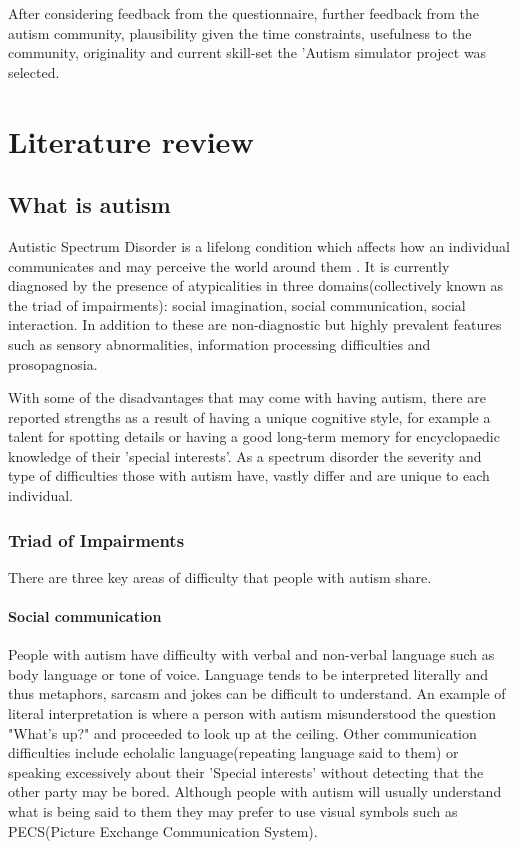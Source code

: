 \documentclass[11pt]{report}
\begin{document}
After considering feedback from the questionnaire, further feedback from the autism community, plausibility given the time constraints, usefulness to the community, originality and current skill-set the 'Autism simulator project was selected.

\chapter{Literature review}

\section{What is autism}

Autistic Spectrum Disorder is a lifelong condition which affects how an individual communicates and may perceive the world around them \cite{nas}. It is currently diagnosed by the presence of atypicalities in three domains(collectively known as the triad of impairments): social imagination, social communication, social interaction. In addition to these are non-diagnostic but highly prevalent features such as sensory abnormalities, information processing difficulties and prosopagnosia. 

With some of the disadvantages that may come with having autism, there are reported strengths as a result of having a unique cognitive style, for example a talent for spotting details\cite{bayes} or having a good long-term memory for encyclopaedic knowledge of their 'special interests'. As a spectrum disorder the severity and type of difficulties those with autism have, vastly differ and are unique to each individual.


\subsection{Triad of Impairments}

There are three key areas of difficulty that people with autism share.

\subsubsection*{Social communication}
People with autism have difficulty with verbal and non-verbal language such as body language or tone of voice. Language tends to be interpreted literally and thus metaphors, sarcasm and jokes can be difficult to understand\cite{nas}. An example of literal interpretation is where a person with autism misunderstood the question "What's up?" and proceeded to look up at the ceiling. Other communication difficulties include echolalic language(repeating language said to them) or speaking excessively about their 'Special interests' without detecting that the other party may be bored\cite{nas}. Although people with autism will usually understand what is being said to them they may prefer to use visual symbols such as PECS(Picture Exchange Communication System). 
\end{document}
